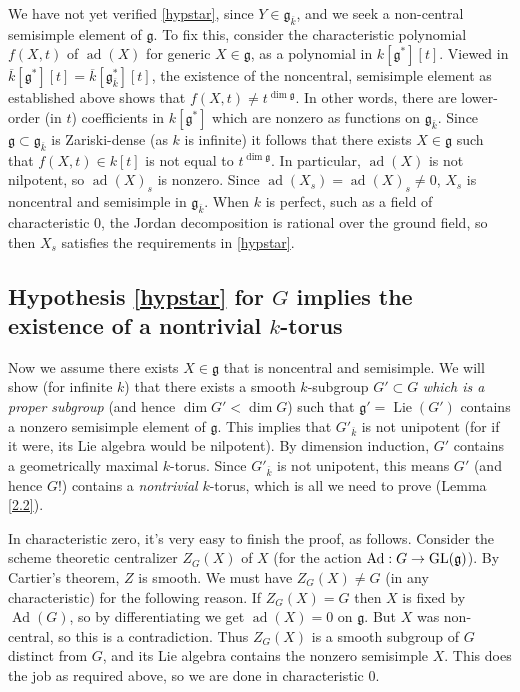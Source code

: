 \documentclass[10pt]{article}
\renewcommand{\(}{\left(}
\renewcommand{\)}{\right)}
\numberwithin{thm}{subsection}
\begin{document}
We have not yet verified \eqref{hypstar},
since $Y \in \mathfrak{g}_{\overline{k}}$, and we seek a non-central
semisimple element of $\mathfrak{g}$.
To fix this, consider the characteristic polynomial $f(X,t)$
of $\operatorname{ad}(X)$ for generic $X\in \mathfrak{g}$,
as a polynomial in $k[\mathfrak{g}^{\ast}][t]$.
Viewed in $\overline{k}[\mathfrak{g}^{\ast}][t]
=\overline{k}[\mathfrak{g}^{\ast}_{\overline{k}}][t]$,
the existence of the noncentral, semisimple element as 
established above
shows that $f(X,t)\neq t^{\dim \mathfrak{g}}$.
In other words, there are lower-order (in $t$) coefficients in $k[\mathfrak{g}^{\ast}]$ 
which are nonzero as functions on $\mathfrak{g}_{\overline{k}}$.
Since $\mathfrak{g}\subset \mathfrak{g}_{\overline{k}}$ is
Zariski-dense (as $k$ is infinite)
it follows that there exists $X\in \mathfrak{g}$ such that
$f(X,t)\in k[t]$ is not equal to $t^{\dim \mathfrak{g}}$.
In particular, $\operatorname{ad}(X)$ is not nilpotent, so $\operatorname{ad}(X)_s$ is nonzero.
Since $\operatorname{ad}(X_s)=\operatorname{ad}(X)_s\neq 0$, 
$X_s$ is noncentral and semisimple in 
$\mathfrak{g}_{\overline{k}}$.  When $k$ is perfect, such as a field of characteristic 0,
the Jordan decomposition is rational over the ground field, so then $X_s$ satisfies
the requirements in 
\eqref{hypstar}.


\subsection{Hypothesis \eqref{hypstar} for $G$ implies the existence
of a nontrivial $k$-torus}

Now we assume there exists $X\in \mathfrak{g}$ that is noncentral and semisimple.
We will show (for infinite $k$) that there exists a smooth $k$-subgroup
$G'\subset G$ \textit{which is a proper subgroup}
(and hence $\dim G'<\dim G$) 
such that $\mathfrak{g}'=\operatorname{Lie}(G')$ contains
a nonzero semisimple element of $\mathfrak{g}$.
This implies that $G'_{\overline{k}}$ is not unipotent
(for if it were, its Lie algebra would be nilpotent).
By dimension induction, $G'$ contains a geometrically maximal $k$-torus.
Since $G'_{\overline{k}}$ is not unipotent,
this means $G'$ (and hence $G$!) contains a \textit{nontrivial} $k$-torus, which is
all we need to prove (Lemma \ref{2.2}). 

In characteristic zero, it's very easy to finish the proof, as follows. 
Consider the scheme theoretic centralizer $Z_G(X)$ of $X$
(for the action $\operatorname{Ad}:G \rightarrow {\rm{GL}}(\mathfrak{g})$).
By Cartier's theorem, $Z$ is smooth. We must have $Z_G(X) \ne G$
(in any characteristic) for the following reason. 
If $Z_G(X) = G$ then $X$ is fixed by $\operatorname{Ad}(G)$,
so by differentiating we get $\operatorname{ad}(X)=0$ on $\mathfrak{g}$. 
But $X$ was non-central, so this is a contradiction.
Thus $Z_G(X)$ is a smooth subgroup of $G$ distinct from $G$,
and its Lie algebra contains the nonzero semisimple $X$.  This does the job as required
above, so we are done in characteristic 0.
\end{document}
